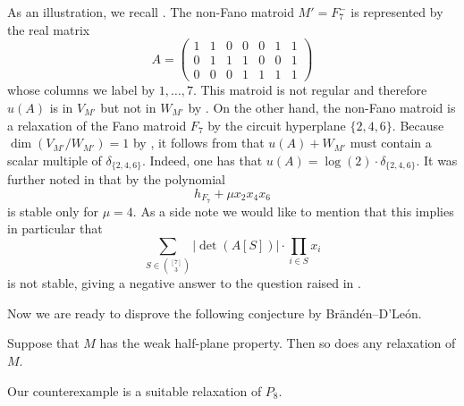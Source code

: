 \documentclass[11pt]{article}
\theoremstyle{definition}
\numberwithin{equation}{section}
\begin{document}
\begin{ex}\label{ex:f7}
    As an illustration, we recall \cite[Example~4.1]{BrandenDLeon}. The non-Fano matroid $M'=F_7^{-}$ is represented by the real matrix
    \[A=\begin{pmatrix}
        1&1&0&0&0&1&1\\
        0&1&1&1&0&0&1\\
        0&0&0&1&1&1&1
    \end{pmatrix}\]
    whose columns we label by $1,\ldots,7$. This matroid is not regular \cite[\S A.2.2]{HPPlong} and therefore $u(A)$ is in $V_{M'}$ but not in $W_{M'}$ by . On the other hand, the non-Fano matroid is a relaxation of the Fano matroid $F_7$ by the circuit hyperplane $\{2,4,6\}$. Because $\dim(V_{M'}/W_{M'})=1$ by \cite{BrandenDLeon}, it follows from  that $u(A)+W_{M'}$ must contain a scalar multiple of $\delta_{\{2,4,6\}}$. Indeed, one has that $u(A)=\log(2)\cdot\delta_{\{2,4,6\}}$. It was further noted in \cite[Example~4.1]{BrandenDLeon} that by \cite[Example~11.5]{HPPlong} the polynomial
    \begin{equation*}
        h_{F_7}+\mu x_2x_4x_6
    \end{equation*}
    is stable only for $\mu=4$. As a side note we would like to mention that this implies in particular that
    \begin{equation*}
        \sum_{S\in\binom{[7]}{3}}|\det(A[S])|\cdot\prod_{i\in S}x_i
    \end{equation*}
    is not stable, giving a negative answer to the question raised in \cite[Remark~4.2]{purbhoo}.
\end{ex}

Now we are ready to disprove the following conjecture by Br{\"a}nd{\'e}n--{D}'Le{\'o}n.

\begin{con}\label{con:relax}
    Suppose that $M$ has the weak half-plane property. Then so does any relaxation of $M$.
\end{con}

Our counterexample is a suitable relaxation of $P_8$.
\end{document}
